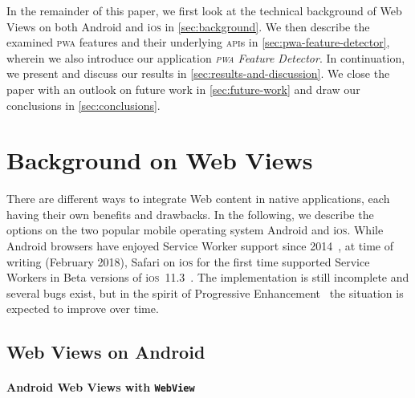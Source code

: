 \documentclass[sigconf,hyphens]{acmart}
\begin{document}
In the remainder of this paper, we first look at the technical background of Web Views
on both Android and i\textsc{os} in \autoref{sec:background}.
We then describe the examined \textsc{pwa} features and their underlying \textsc{api}s
in \autoref{sec:pwa-feature-detector}, wherein we also introduce
our application \emph{\textsc{pwa} Feature Detector}.
In continuation, we present and discuss our results in \autoref{sec:results-and-discussion}.
We close the paper with an outlook on future work in \autoref{sec:future-work}
and draw our conclusions in \autoref{sec:conclusions}.

\section{Background on Web Views}
\label{sec:background}

There are different ways to integrate Web content in native applications,
each having their own benefits and drawbacks.
In the following, we describe the options on the two popular
mobile operating system Android and i\textsc{os}.
While Android browsers have enjoyed Service Worker support since 2014~\cite{cooney2014chromium},
at time of writing (February 2018), Safari on i\textsc{os}
for the first time supported Service Workers
in Beta versions of i\textsc{os}~11.3~\cite{mondello2018safari}.
The implementation is still incomplete and several bugs exist, but in the spirit of
Progressive Enhancement~\cite{champeon2003progressiveenhancement}
the situation is expected to improve over time.

\subsection{Web Views on Android}

\paragraph{Android Web Views with \texttt{WebView}}
\end{document}
